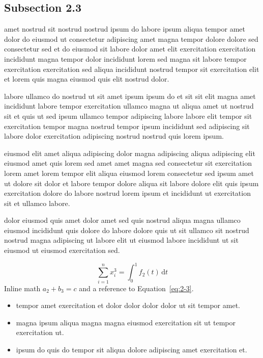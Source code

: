 \documentclass{article}
\begin{document}
\subsection{Subsection 2.3}\label{sec:2-3}
amet nostrud sit nostrud nostrud ipsum do labore ipsum aliqua tempor amet dolor do eiusmod ut consectetur adipiscing amet magna tempor dolore dolore sed consectetur sed et do eiusmod sit labore dolor amet elit exercitation exercitation incididunt magna tempor dolor incididunt lorem sed magna sit labore tempor exercitation exercitation sed aliqua incididunt nostrud tempor sit exercitation elit et lorem quis magna eiusmod quis elit nostrud dolor.

labore ullamco do nostrud ut sit amet ipsum ipsum do et sit sit elit magna amet incididunt labore tempor exercitation ullamco magna ut aliqua amet ut nostrud sit et quis ut sed ipsum ullamco tempor adipiscing labore labore elit tempor sit exercitation tempor magna nostrud tempor ipsum incididunt sed adipiscing sit labore dolor exercitation adipiscing nostrud nostrud quis lorem ipsum.

eiusmod elit amet aliqua adipiscing dolor magna adipiscing aliqua adipiscing elit eiusmod amet quis lorem sed amet amet magna sed consectetur sit exercitation lorem amet lorem tempor elit aliqua eiusmod lorem consectetur sed ipsum amet ut dolore sit dolor et labore tempor dolore aliqua sit labore dolore elit quis ipsum exercitation dolore do labore nostrud lorem ipsum et incididunt ut exercitation sit et ullamco labore.

dolor eiusmod quis amet dolor amet sed quis nostrud aliqua magna ullamco eiusmod incididunt quis dolore do labore dolore quis ut sit ullamco sit nostrud nostrud magna adipiscing ut labore elit ut eiusmod labore incididunt ut sit eiusmod ut eiusmod exercitation sed.

\begin{equation}\label{eq:2-3}
  \sum_{i=1}^{n} x_i^{3} = \int_0^1 f_{2}(t)\,\mathrm{d}t
\end{equation}
Inline math $a_{2} + b_{3} = c$ and a reference to Equation~\eqref{eq:2-3}.

\begin{itemize}
  \item tempor amet exercitation et dolor dolor dolor dolor ut sit tempor amet.
  \item magna ipsum aliqua magna magna eiusmod exercitation sit ut tempor exercitation ut.
  \item ipsum do quis do tempor sit aliqua dolore adipiscing amet exercitation et.
\end{itemize}
\end{document}
